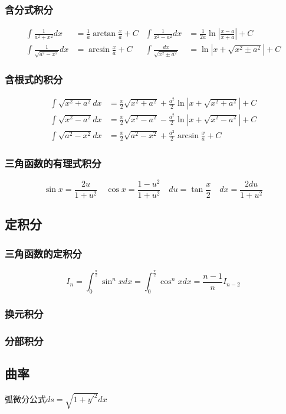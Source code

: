 \documentclass[a4paper,zihao=-4,UTF8]{ctexbook}
\begin{document}
\subsubsection{含分式积分}
\begin{align*}
\int \frac{1}{a^{2}+x^{2}}dx&=\frac{1}{a} \arctan \frac{x}{a}+C &
\int \frac{1}{x^{2}-a^{2}}dx&=\frac{1}{2 a} \ln \left|\frac{x-a}{x+a}\right|+C\\
    \int \frac{1}{\sqrt{a^{2}-x^{2}}}dx&=\arcsin \frac{x}{a}+C&
    \int \frac{d x}{\sqrt{x^{2} \pm a^{2}}}&=\ln \left|x+\sqrt{x^{2} \pm a^{2}}\right|+C
\end{align*}
\subsubsection{含根式的积分}
\begin{align*}
    \int \sqrt{x^{2}+a^{2}} d x&=\frac{x}{2} \sqrt{x^{2}+a^{2}}+\frac{a^{2}}{2} \ln \left|x+\sqrt{x^{2}+a^{2}}\right|+C \\
     \int \sqrt{x^{2}-a^{2}} d x&=\frac{x}{2} \sqrt{x^{2}-a^{2}}-\frac{a^{2}}{2} \ln \left|x+\sqrt{x^{2}-a^{2}}\right|+C \\ 
     \int \sqrt{a^{2}-x^{2}} d x&=\frac{x}{2} \sqrt{a^{2}-x^{2}}+\frac{a^{2}}{2} \arcsin \frac{x}{a}+C
\end{align*}
\subsubsection{三角函数的有理式积分}
\[\sin x=\frac{2u}{1+u^2}\quad \cos x=\frac{1-u^2}{1+u^2}\quad du=\tan\frac x2\quad dx=\frac{2du}{1+u^2}\]
\subsection{定积分}
\subsubsection{三角函数的定积分}
\[
I_{n}=\int_{0}^{\frac{\pi}{2}} \sin ^{n} x d x=\int_{0}^{\frac{\pi}{2}} \cos ^{n} x d x=\frac{n-1}{n} I_{n-2}
\]
\subsubsection{换元积分}
\subsubsection{分部积分}
\subsection{曲率}
弧微分公式$ds=\sqrt{1+y'^2}dx$
\end{document}
